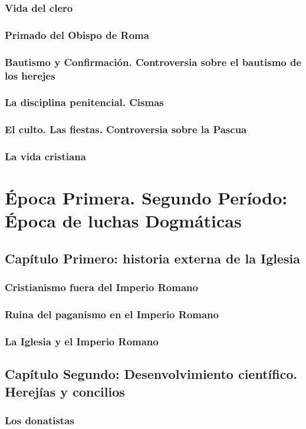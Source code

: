 \raggedbottom{} \documentclass[12pt, a4paper]{book}
\begin{document}
\section{Vida del clero}
\section{Primado del Obispo de Roma}
\section{Bautismo y Confirmación. Controversia sobre el bautismo de los herejes}
\section{La disciplina penitencial. Cismas}
\section{El culto. Las fiestas. Controversia sobre la Pascua}
\section{La vida cristiana}
\part{Época Primera. Segundo Período: Época de luchas Dogmáticas}
\chapter{Capítulo Primero: historia externa de la Iglesia}
\section{Cristianismo fuera del Imperio Romano}
\section{Ruina del paganismo en el Imperio Romano}
\section{La Iglesia y el Imperio Romano}
\chapter{Capítulo Segundo: Desenvolvimiento científico. Herejías y concilios}
\section{Los donatistas}
\end{document}
